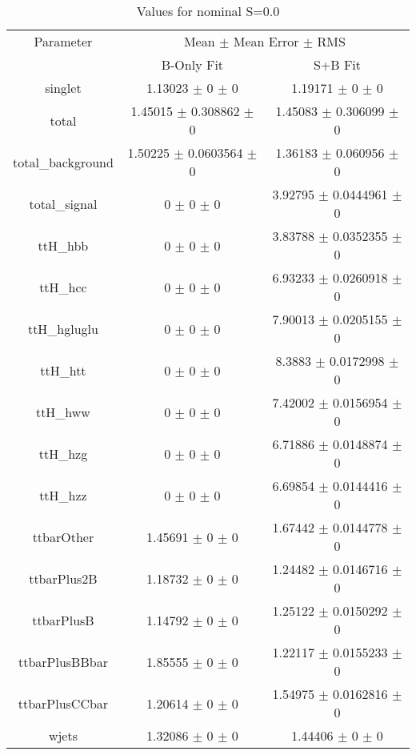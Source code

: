 \begin{table}
\centering
\caption{Values for nominal S=0.0}
\begin{tabular}{ccc}
\toprule
Parameter & \multicolumn{2}{c}{Mean $\pm$ Mean Error $\pm$ RMS}\\
 & B-Only Fit & S+B Fit\\
\midrule
singlet & \num{1.13023} $\pm$ \num{0} $\pm$ \num{0} & \num{1.19171} $\pm$ \num{0} $\pm$ \num{0}\\
total & \num{1.45015} $\pm$ \num{0.308862} $\pm$ \num{0} & \num{1.45083} $\pm$ \num{0.306099} $\pm$ \num{0}\\
total\_background & \num{1.50225} $\pm$ \num{0.0603564} $\pm$ \num{0} & \num{1.36183} $\pm$ \num{0.060956} $\pm$ \num{0}\\
total\_signal & \num{0} $\pm$ \num{0} $\pm$ \num{0} & \num{3.92795} $\pm$ \num{0.0444961} $\pm$ \num{0}\\
ttH\_hbb & \num{0} $\pm$ \num{0} $\pm$ \num{0} & \num{3.83788} $\pm$ \num{0.0352355} $\pm$ \num{0}\\
ttH\_hcc & \num{0} $\pm$ \num{0} $\pm$ \num{0} & \num{6.93233} $\pm$ \num{0.0260918} $\pm$ \num{0}\\
ttH\_hgluglu & \num{0} $\pm$ \num{0} $\pm$ \num{0} & \num{7.90013} $\pm$ \num{0.0205155} $\pm$ \num{0}\\
ttH\_htt & \num{0} $\pm$ \num{0} $\pm$ \num{0} & \num{8.3883} $\pm$ \num{0.0172998} $\pm$ \num{0}\\
ttH\_hww & \num{0} $\pm$ \num{0} $\pm$ \num{0} & \num{7.42002} $\pm$ \num{0.0156954} $\pm$ \num{0}\\
ttH\_hzg & \num{0} $\pm$ \num{0} $\pm$ \num{0} & \num{6.71886} $\pm$ \num{0.0148874} $\pm$ \num{0}\\
ttH\_hzz & \num{0} $\pm$ \num{0} $\pm$ \num{0} & \num{6.69854} $\pm$ \num{0.0144416} $\pm$ \num{0}\\
ttbarOther & \num{1.45691} $\pm$ \num{0} $\pm$ \num{0} & \num{1.67442} $\pm$ \num{0.0144778} $\pm$ \num{0}\\
ttbarPlus2B & \num{1.18732} $\pm$ \num{0} $\pm$ \num{0} & \num{1.24482} $\pm$ \num{0.0146716} $\pm$ \num{0}\\
ttbarPlusB & \num{1.14792} $\pm$ \num{0} $\pm$ \num{0} & \num{1.25122} $\pm$ \num{0.0150292} $\pm$ \num{0}\\
ttbarPlusBBbar & \num{1.85555} $\pm$ \num{0} $\pm$ \num{0} & \num{1.22117} $\pm$ \num{0.0155233} $\pm$ \num{0}\\
ttbarPlusCCbar & \num{1.20614} $\pm$ \num{0} $\pm$ \num{0} & \num{1.54975} $\pm$ \num{0.0162816} $\pm$ \num{0}\\
wjets & \num{1.32086} $\pm$ \num{0} $\pm$ \num{0} & \num{1.44406} $\pm$ \num{0} $\pm$ \num{0}\\
\bottomrule
\end{tabular}
\end{table}